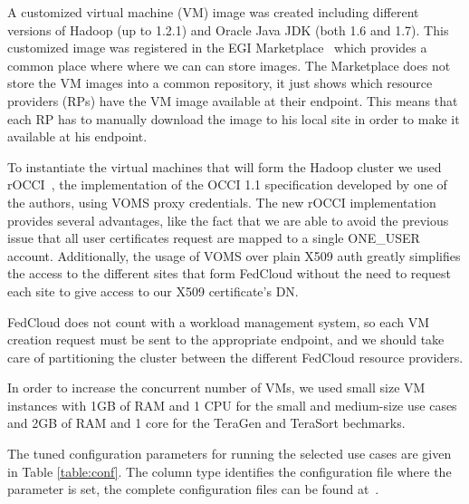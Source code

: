 A customized virtual machine (VM) image was created including different versions of Hadoop (up to 1.2.1) and Oracle Java JDK (both 1.6 and 1.7).
This customized image was registered in the EGI Marketplace~\cite{marketplace} which provides a common place where where we can can store images. The Marketplace does not store the VM images into a common repository, it just shows which resource providers (RPs) have the VM image available at their endpoint. This means that each RP has to manually download the image to his local site in order to make it available at his endpoint. 

To instantiate the virtual machines that will form the Hadoop cluster we used rOCCI~\cite{rocci}, the implementation of the OCCI 1.1 specification developed by one of the authors, using VOMS proxy credentials. The new rOCCI implementation provides several advantages, like the fact that we are able to avoid the previous issue that all user certificates request are mapped to a single ONE\_USER account.
Additionally, the usage of VOMS over plain X509 auth greatly simplifies the access to the different sites that form FedCloud without the need to request each site to give access to our X509 certificate's DN.

FedCloud does not count with a workload management system, so each VM creation request must be sent to the appropriate endpoint, and we should take care of partitioning the cluster between the different FedCloud resource providers.



In order to increase the concurrent number of VMs, we used small size VM instances with 1GB of RAM and 1 CPU for the small and medium-size use cases and 2GB of RAM and 1 core for the TeraGen and TeraSort bechmarks.


The tuned configuration parameters for running the selected use cases are given in Table \ref{table:conf}. The column type identifies the configuration file where the parameter is set, the complete configuration files can be found at~\cite{scripts}.

